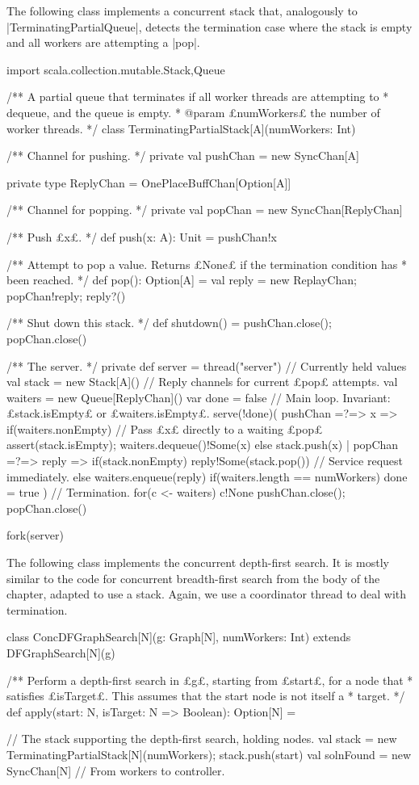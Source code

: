 \begin{answerI}
The following class implements a concurrent stack that, analogously to
|TerminatingPartialQueue|, detects the termination case where the stack is
empty and all workers are attempting a |pop|.
%
\begin{scala}
import scala.collection.mutable.{Stack,Queue}

/** A partial queue that terminates if all worker threads are attempting to
  * dequeue, and the queue is empty.
  * @param £numWorkers£ the number of worker threads. */
class TerminatingPartialStack[A](numWorkers: Int){
  /** Channel for pushing. */
  private val pushChan = new SyncChan[A]

  private type ReplyChan = OnePlaceBuffChan[Option[A]]

  /** Channel for popping. */
  private val popChan = new SyncChan[ReplyChan]

  /** Push £x£. */
  def push(x: A): Unit = pushChan!x

  /** Attempt to pop a value.  Returns £None£ if the termination condition has
    * been reached. */
  def pop(): Option[A] = { 
    val reply = new ReplayChan; popChan!reply; reply?() 
  }

  /** Shut down this stack. */
  def shutdown() = { pushChan.close(); popChan.close() }

  /** The server. */
  private def server = thread("server"){
    // Currently held values
    val stack = new Stack[A]()
    // Reply channels for current £pop£ attempts.
    val waiters = new Queue[ReplyChan]() 
    var done = false
    // Main loop.  Invariant: £stack.isEmpty£ or £waiters.isEmpty£.
    serve(!done)(
      pushChan =?=> { x => 
        if(waiters.nonEmpty){ // Pass £x£ directly to a waiting £pop£
          assert(stack.isEmpty); waiters.dequeue()!Some(x)
        }
        else stack.push(x)
      }
      |  
      popChan =?=> { reply =>
        if(stack.nonEmpty) 
          reply!Some(stack.pop()) // Service request immediately.
        else{
          waiters.enqueue(reply)
          if(waiters.length == numWorkers) done = true
        }
      }
    )
    // Termination.
    for(c <- waiters) c!None
    pushChan.close(); popChan.close()
  }

  fork(server)
}
\end{scala}


The following class implements the concurrent depth-first search.  It is
mostly similar to the code for concurrent breadth-first search from the body
of the chapter, adapted to use a stack.  Again, we use a coordinator thread to
deal with termination.
%
\begin{scala}
class ConcDFGraphSearch[N](g: Graph[N], numWorkers: Int)
     extends DFGraphSearch[N](g){
  /** Perform a depth-first search in £g£, starting from £start£, for a node that
    * satisfies £isTarget£.  This assumes that the start node is not itself a
    * target. */
  def apply(start: N, isTarget: N => Boolean): Option[N] = {
    // The stack supporting the depth-first search, holding nodes.
    val stack = new TerminatingPartialStack[N](numWorkers); stack.push(start)
    val solnFound = new SyncChan[N] // From workers to controller.

}}
\end{scala}
\end{answerI}
